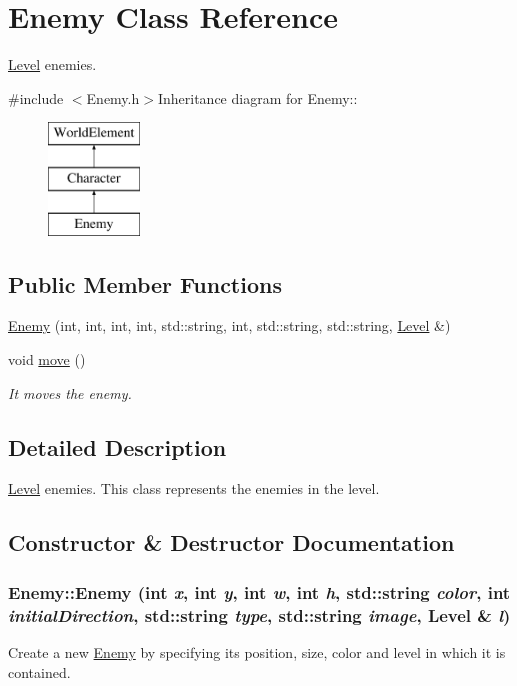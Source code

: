 \hypertarget{classEnemy}{
\section{Enemy Class Reference}
\label{classEnemy}
}


\hyperlink{classLevel}{Level} enemies.  


{\ttfamily \#include $<$Enemy.h$>$}Inheritance diagram for Enemy::\begin{figure}[H]
\begin{center}
\leavevmode
\includegraphics[height=3cm]{classEnemy}
\end{center}
\end{figure}
\subsection*{Public Member Functions}
\begin{DoxyCompactItemize}
\item 
\hyperlink{classEnemy_a4e510ab21b2b8fc986720ac9ab7a4c6a}{Enemy} (int, int, int, int, std::string, int, std::string, std::string, \hyperlink{classLevel}{Level} \&)
\item 
void \hyperlink{classEnemy_a9a398f8d12234f02563b27440aff7891}{move} ()
\begin{DoxyCompactList}\small\item\em It moves the enemy. \item\end{DoxyCompactList}\end{DoxyCompactItemize}


\subsection{Detailed Description}
\hyperlink{classLevel}{Level} enemies. This class represents the enemies in the level. 

\subsection{Constructor \& Destructor Documentation}
\hypertarget{classEnemy_a4e510ab21b2b8fc986720ac9ab7a4c6a}{
\subsubsection[{Enemy}]{\setlength{\rightskip}{0pt plus 5cm}Enemy::Enemy (int {\em x}, \/  int {\em y}, \/  int {\em w}, \/  int {\em h}, \/  std::string {\em color}, \/  int {\em initialDirection}, \/  std::string {\em type}, \/  std::string {\em image}, \/  {\bf Level} \& {\em l})}}
\label{classEnemy_a4e510ab21b2b8fc986720ac9ab7a4c6a}
Create a new \hyperlink{classEnemy}{Enemy} by specifying its position, size, color and level in which it is contained. 

